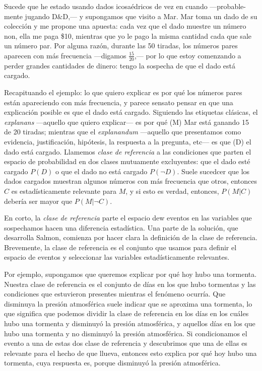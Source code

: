 Sucede que he estado usando dados icosaédricos de vez en cuando
---probable-mente jugando D$\&$D,--- y supongamos que visito a
Mar. Mar toma un dado de su colección y me propone una apuesta: cada
vez que el dado muestre un número non, ella me paga \$10, mientras
que yo le pago la misma cantidad cada que sale un número par. Por
alguna razón, durante las 50 tiradas, los números pares aparecen con
más frecuencia ---digamos $ \frac{ 15 }{ 20 } $,--- por lo que estoy
comenzando a perder grandes cantidades de dinero: tengo la sospecha
de que el dado está cargado.

Recapituando el ejemplo: lo que quiero explicar es por qué los
números pares están apareciendo con más frecuencia, y parece sensato
pensar en que una explicación posible es que el dado está cargado.
Siguiendo las etiquetas clásicas, el \emph{explanans} ---aquello que
quiero explicar--- es por qué (M) Mar está ganando 15 de 20 tiradas;
mientras que el \emph {explanandum} ---aquello que presentamos como
evidencia, justificación, hipótesis, la respuesta a la pregunta,
etc--- es que (D) el dado está cargado. Llamemos \emph{clase de
	referencia} a las condiciones que parten el espacio de probabilidad
en dos clases mutuamente excluyentes: que el dado esté cargado $ P( D ) $
o que el dado no está cargado $ P( \neg D ) $. Suele sucedcer que los
dados cargados muestran algunos números con más frecuencia que otros,
entonces $ C $ es estadísticamente relevante para $ M $, y si esto es
verdad, entonces, $ P( M | C ) $ debería ser mayor que $  P( M | \neg C )
$.

En corto, la \emph{clase de referencia} parte el espacio dew eventos
en las variables que sospechamos hacen una diferencia estadística.
Una parte de la solución, que desarrolla Salmon, comienza por hacer
clara la definición de la clase de referencia. Brevemente, la clase
de referencia es el conjunto que usamos para definir el espacio de
eventos y seleccionar las variables estadísticamente relevantes.

Por ejemplo, supongamos que queremos explicar por qué hoy hubo una
tormenta. Nuestra clase de referencia es el conjunto de días en los que
hubo tormentas y las condiciones que estuvieron presentes mientras el
fenómeno ocurría. Que disminuya la presión atmosférica suele indicar
que se aproxima una tormenta, lo que significa que podemos dividir la
clase de referencia en los días en los cuáles hubo una tormenta y
disminuyó la presión atmosférica, y aquellos días en los que hubo una
tormenta y no disminuyó la presión atmosférica. Si condicionamos el
evento a una de estas dos clase de referencia y descubrimos que una
de ellas es relevante para el hecho de que llueva, entonces esto
explica por qué hoy hubo una tormenta, cuya respuesta es, porque
disminuyó la presión atmosférica.

